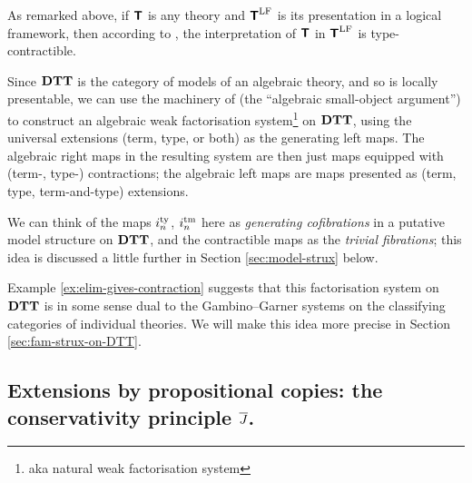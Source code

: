 \documentclass{amsart}
\begin{document}
\begin{example}
As remarked above, if $\textbf{\textsf{T}}$ is any theory and $\textbf{\textsf{T}}^\mathrm{LF}$ is its presentation in a logical framework, then according to \cite[]{hofmann:syntax-and-semantics}, the interpretation of $\textbf{\textsf{T}}$ in $\textbf{\textsf{T}}^\mathrm{LF}$ is type-contractible. 
\end{example}

\begin{para} Since $\mathbf{DTT}$ is the category of models of an algebraic theory, and so is locally presentable, we can use the machinery of \cite{garner:understanding} (the ``algebraic small-object argument'') to construct an algebraic weak factorisation system\footnote{aka natural weak factorisation system} on $\mathbf{DTT}$, using the universal extensions (term, type, or both) as the generating left maps.  The algebraic right maps in the resulting system are then just maps equipped with (term-, type-) contractions; the algebraic left maps are maps presented as (term, type, term-and-type) extensions.

We can think of the maps $i^{\textrm{ty}}_n$, $i^{\textrm{tm}}_n$ here as \emph{generating cofibrations} in a putative model structure on $\mathbf{DTT}$, and the contractible maps as the \emph{trivial fibrations}; this idea is discussed a little further in Section \ref{sec:model-strux} below.

Example \ref{ex:elim-gives-contraction} suggests that this factorisation system on $\mathbf{DTT}$ is in some sense dual to the Gambino--Garner systems on the classifying categories of individual theories.  We will make this idea more precise in Section \ref{sec:fam-strux-on-DTT}.
\end{para}






\subsection{Extensions by propositional copies: the conservativity principle $\overline{J}$.}
\end{document}
